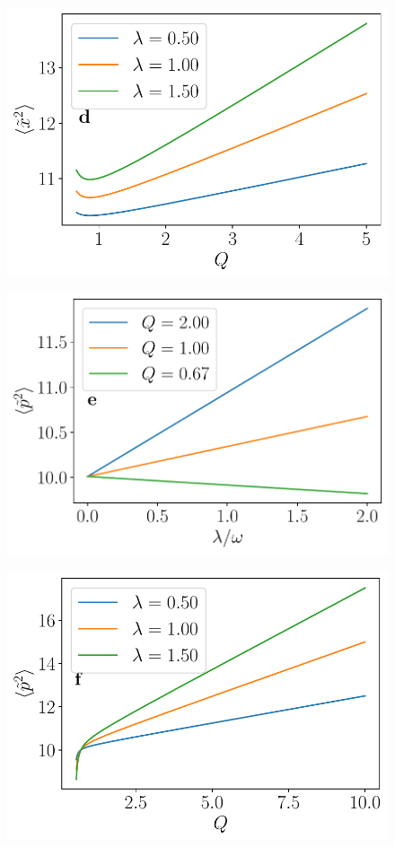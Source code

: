 \hfill
\begin{subfigure}[t]{0.48\textwidth}
    \includegraphics[width=\textwidth]{figures/x2_vs_Q}
\end{subfigure}
\begin{subfigure}[t]{0.48\textwidth}
    \includegraphics[width=\textwidth]{figures/p2_vs_lambda}
\end{subfigure}
\hfill
\begin{subfigure}[t]{0.48\textwidth}
    \includegraphics[width=\textwidth]{figures/p2_vs_Q}
\end{subfigure}